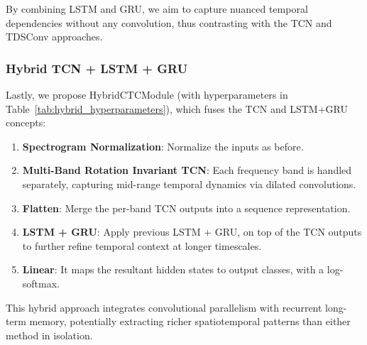 By combining LSTM and GRU, we aim to capture nuanced temporal dependencies without any convolution, thus contrasting with the TCN and TDSConv approaches.

\subsubsection{Hybrid TCN + LSTM + GRU}


Lastly, we propose HybridCTCModule (with hyperparameters in Table~\ref{tab:hybrid_hyperparameters}), which fuses the TCN and LSTM+GRU concepts:

\begin{enumerate}
    \item\textbf{Spectrogram Normalization}: Normalize the inputs as before.

    \item\textbf{Multi-Band Rotation Invariant TCN}: Each frequency band is handled separately, capturing mid-range temporal dynamics via dilated convolutions.

    \item\textbf{Flatten}: Merge the per-band TCN outputs into a sequence representation.

    \item\textbf{LSTM + GRU}: Apply previous LSTM + GRU, on top of the TCN outputs to further refine temporal context at longer timescales.

    \item\textbf{Linear}: It maps the resultant hidden states to output classes, with a log-softmax.
\end{enumerate}

This hybrid approach integrates convolutional parallelism with recurrent long-term memory, potentially extracting richer spatiotemporal patterns than either method in isolation.
